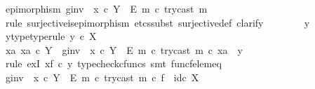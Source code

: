 \begin{isabellebody}
\ {\isachardoublequoteopen}epimorphism\ {\isacharparenleft}{\kern0pt}g{\isacharunderscore}{\kern0pt}inv\ {\isasymamalg}\ {\isacharparenleft}{\kern0pt}x\ {\isasymcirc}\isactrlsub c\ {\isasymbeta}\isactrlbsub Y\ {\isasymsetminus}\ {\isacharparenleft}{\kern0pt}E{\isacharcomma}{\kern0pt}\ m{\isacharparenright}{\kern0pt}\isactrlesub {\isacharparenright}{\kern0pt}\ {\isasymcirc}\isactrlsub c\ try{\isacharunderscore}{\kern0pt}cast\ m{\isacharparenright}{\kern0pt}{\isachardoublequoteclose}\isanewline
\ \ \ \ \isamarkupfalse%
\ {\isacharparenleft}{\kern0pt}rule\ surjective{\isacharunderscore}{\kern0pt}is{\isacharunderscore}{\kern0pt}epimorphism{\isacharcomma}{\kern0pt}\ etcs{\isacharunderscore}{\kern0pt}subst\ surjective{\isacharunderscore}{\kern0pt}def{}{\isacharcomma}{\kern0pt}\ clarify{\isacharparenright}{\kern0pt}\isanewline
\ \ \ \ \ \ \isamarkupfalse%
\ y\isanewline
\ \ \ \ \ \ \isamarkupfalse%
\ y{\isacharunderscore}{\kern0pt}type{\isacharbrackleft}{\kern0pt}type{\isacharunderscore}{\kern0pt}rule{\isacharbrackright}{\kern0pt}{\isacharcolon}{\kern0pt}\ {\isachardoublequoteopen}y\ {\isasymin}\isactrlsub c\ X{\isachardoublequoteclose}\isanewline
\ \ \ \ \ \ \isamarkupfalse%
\ {\isachardoublequoteopen}{\isasymexists}xa{\isachardot}{\kern0pt}\ xa\ {\isasymin}\isactrlsub c\ Y\ {\isasymand}\ {\isacharparenleft}{\kern0pt}g{\isacharunderscore}{\kern0pt}inv\ {\isasymamalg}\ {\isacharparenleft}{\kern0pt}x\ {\isasymcirc}\isactrlsub c\ {\isasymbeta}\isactrlbsub Y\ {\isasymsetminus}\ {\isacharparenleft}{\kern0pt}E{\isacharcomma}{\kern0pt}\ m{\isacharparenright}{\kern0pt}\isactrlesub {\isacharparenright}{\kern0pt}\ {\isasymcirc}\isactrlsub c\ try{\isacharunderscore}{\kern0pt}cast\ m{\isacharparenright}{\kern0pt}\ {\isasymcirc}\isactrlsub c\ xa\ {\isacharequal}{\kern0pt}\ y{\isachardoublequoteclose}\isanewline
\ \ \ \ \ \ \ \ \isamarkupfalse%
\ {\isacharparenleft}{\kern0pt}rule\ exI{\isacharbrackleft}{\kern0pt}\ x{\isacharequal}{\kern0pt}{\isachardoublequoteopen}f\ {\isasymcirc}\isactrlsub c\ y{\isachardoublequoteclose}{\isacharbrackright}{\kern0pt}{\isacharcomma}{\kern0pt}\ typecheck{\isacharunderscore}{\kern0pt}cfuncs{\isacharcomma}{\kern0pt}\ smt\ func{\isacharunderscore}{\kern0pt}f{\isacharunderscore}{\kern0pt}elem{\isacharunderscore}{\kern0pt}eq{\isacharparenright}{\kern0pt}\isanewline
\ \ \ \ \isamarkupfalse%
\isanewline
\ \ \ \ \isamarkupfalse%
\ {\isachardoublequoteopen}{\isacharparenleft}{\kern0pt}g{\isacharunderscore}{\kern0pt}inv\ {\isasymamalg}\ {\isacharparenleft}{\kern0pt}x\ {\isasymcirc}\isactrlsub c\ {\isasymbeta}\isactrlbsub Y\ {\isasymsetminus}\ {\isacharparenleft}{\kern0pt}E{\isacharcomma}{\kern0pt}\ m{\isacharparenright}{\kern0pt}\isactrlesub {\isacharparenright}{\kern0pt}\ {\isasymcirc}\isactrlsub c\ try{\isacharunderscore}{\kern0pt}cast\ m{\isacharparenright}{\kern0pt}\ {\isasymcirc}\isactrlsub c\ f\ {\isacharequal}{\kern0pt}\ id\isactrlsub c\ X{\isachardoublequoteclose}\isanewline

\end{isabellebody}
